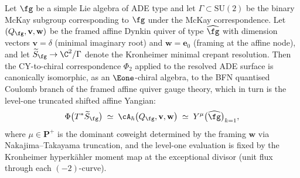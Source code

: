 \begin{theorem}
\label{thm:bfn-phi-ade-identification}
Let $\fg$ be a simple Lie algebra of ADE type and let $\Gamma \subset \mathrm{SU}(2)$ be the binary McKay subgroup corresponding to $\fg$ under the McKay correspondence. Let $(Q_\fg, \mathbf{v}, \mathbf{w})$ be the framed affine Dynkin quiver of type $\widehat{\fg}$ with dimension vectors $\mathbf{v} = \delta$ (minimal imaginary root) and $\mathbf{w} = \mathbf{e}_0$ (framing at the affine node), and let $\widetilde{S}_\fg \to \C^2/\Gamma$ denote the Kronheimer minimal crepant resolution. Then the CY-to-chiral correspondence $\Phi_2$ applied to the resolved ADE surface is canonically isomorphic, as an $\Eone$-chiral algebra, to the BFN quantised Coulomb branch of the framed affine quiver gauge theory, which in turn is the level-one truncated shifted affine Yangian:
\[
 \Phi\bigl(T^*\widetilde{S}_\fg\bigr)
 \;\simeq\;
 \cA_\hbar\bigl(Q_\fg, \mathbf{v}, \mathbf{w}\bigr)
 \;\simeq\;
 Y^\mu\bigl(\widehat{\fg}\bigr)_{k=1},
\]
where $\mu \in \mathbf{P}^+$ is the dominant coweight determined by the framing $\mathbf{w}$ via Nakajima--Takayama truncation, and the level-one evaluation is fixed by the Kronheimer hyperk\"ahler moment map at the exceptional divisor (unit flux through each $(-2)$-curve).
\end{theorem}

